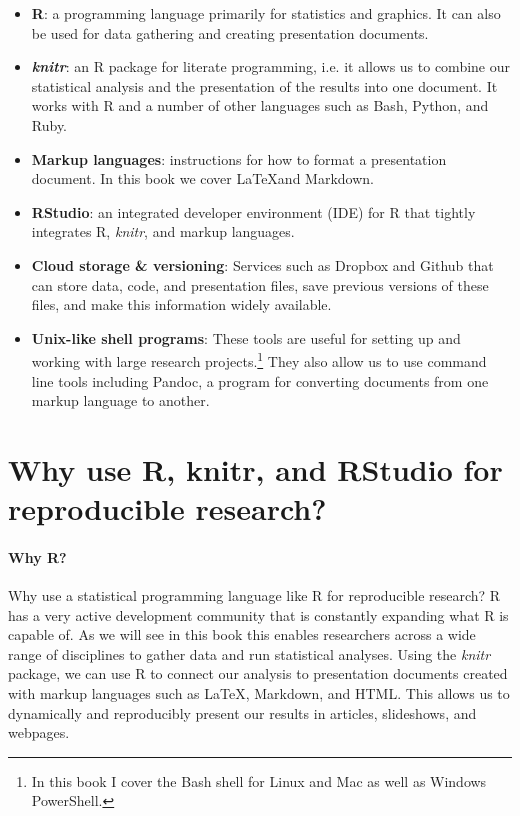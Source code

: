 \begin{itemize}
    \item {\bf{R}}: a programming language primarily for statistics and graphics. It can also be used for data gathering and creating presentation documents.
    
    \item {\bf{{\emph{knitr}}}}: an R package for literate programming, i.e. it allows us to combine our statistical analysis and the presentation of the results into one document. It works with R and a number of other languages such as Bash, Python, and Ruby.
    
    \item {\bf{Markup languages}}: instructions for how to format a presentation document. In this book we cover \LaTeX and Markdown.  
    
    \item {\bf{RStudio}}: an integrated developer environment (IDE) for R that tightly integrates R, {\emph{knitr}}, and markup languages.
    
    \item {\bf{Cloud storage \& versioning}}: Services such as Dropbox and Github that can store data, code, and presentation files, save previous versions of these files, and make this information widely available.
    
    \item {\bf{Unix-like shell programs}}: These tools are useful for setting up and working with large research projects.\footnote{In this book I cover the Bash shell for Linux and Mac as well as Windows PowerShell.} They also allow us to use command line tools including Pandoc, a program for converting documents from one markup language to another.
\end{itemize}


\section{Why use R, knitr, and RStudio for reproducible research?}

\paragraph{Why R?}
Why use a statistical programming language like R for reproducible research? R has a very active development community that is constantly expanding what R is capable of. As we will see in this book this enables researchers across a wide range of disciplines to gather data and run statistical analyses. Using the {\emph{knitr}} package, we can use R to connect our analysis to presentation documents created with markup languages such as \LaTeX, Markdown, and HTML. This allows us to dynamically and reproducibly present our results in articles, slideshows, and webpages. 

